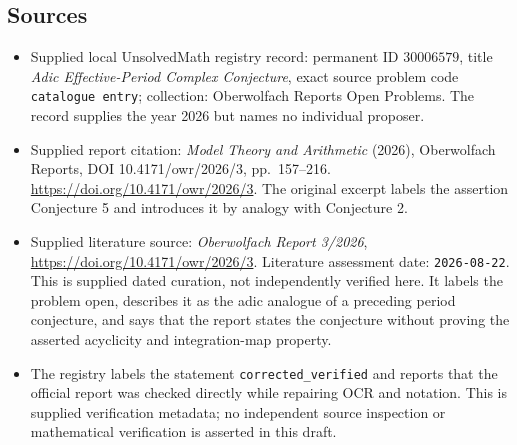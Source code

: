 \documentclass[11pt]{article}
\begin{document}
\subsection{Sources}
\begin{itemize}
\item Supplied local UnsolvedMath registry record: permanent ID \(30006579\), title \emph{Adic Effective-Period Complex Conjecture}, exact source problem code \texttt{catalogue entry}; collection: Oberwolfach Reports Open Problems. The record supplies the year 2026 but names no individual proposer.
\item Supplied report citation: \emph{Model Theory and Arithmetic} (2026), Oberwolfach Reports, DOI 10.4171/owr/2026/3, pp.\ 157--216. \url{https://doi.org/10.4171/owr/2026/3}. The original excerpt labels the assertion Conjecture 5 and introduces it by analogy with Conjecture 2.
\item Supplied literature source: \emph{Oberwolfach Report 3/2026}, \url{https://doi.org/10.4171/owr/2026/3}. Literature assessment date: \texttt{2026-08-22}. This is supplied dated curation, not independently verified here. It labels the problem open, describes it as the adic analogue of a preceding period conjecture, and says that the report states the conjecture without proving the asserted acyclicity and integration-map property.
\item The registry labels the statement \texttt{corrected\_verified} and reports that the official report was checked directly while repairing OCR and notation. This is supplied verification metadata; no independent source inspection or mathematical verification is asserted in this draft.
\end{itemize}
\end{document}
